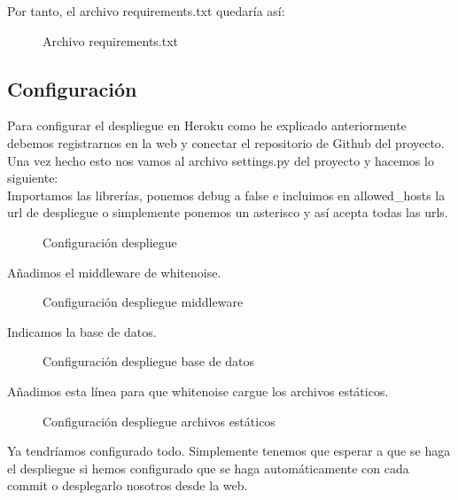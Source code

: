 Por tanto, el archivo requirements.txt quedaría así:
\begin{figure}[H]
  \centering
  \noindent{}
  \caption{Archivo requirements.txt}
\end{figure}


\subsection{Configuración}

Para configurar el despliegue en Heroku como he explicado anteriormente debemos registrarnos en la web y conectar el repositorio de Github del proyecto.
Una vez hecho esto nos vamos al archivo settings.py del proyecto y hacemos lo siguiente:\\
Importamos las librerías, ponemos debug a false e incluimos en allowed\_hosts la url de despliegue o simplemente ponemos un asterisco y así acepta todas las urls.

\begin{figure}[H]
  \centering
  \noindent{}
  \caption{Configuración despliegue}
\end{figure}

Añadimos el middleware de whitenoise.

\begin{figure}[H]
  \centering
  \noindent{}
  \caption{Configuración despliegue middleware}
\end{figure}

Indicamos la base de datos.

\begin{figure}[H]
  \centering
  \noindent{}
  \caption{Configuración despliegue base de datos}
\end{figure}

Añadimos esta línea para que whitenoise cargue los archivos estáticos.

\begin{figure}[H]
  \centering
  \noindent{}
  \caption{Configuración despliegue archivos estáticos}
\end{figure}

Ya tendríamos configurado todo. Simplemente tenemos que esperar a que se haga el despliegue si hemos configurado que se haga automáticamente con cada commit o desplegarlo nosotros desde la web.\\\\

